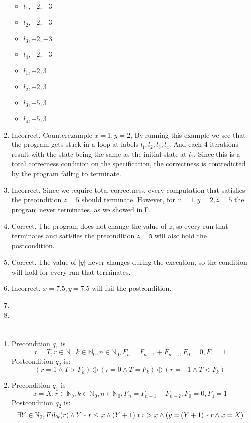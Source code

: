 \documentclass{article}
\begin{document}
\begin{enumerate}[label=\Alph*.]
\begin{itemize}
        \item $l_1, -2, -3$
        \item $l_2, -2, -3$
        \item $l_3, -2, -3$
        \item $l_4, -2, -3$
        \item $l_1, -2, 3$
        \item $l_2, -2, 3$
        \item $l_3, -5, 3$
        \item $l_4, -5, 3$
    \end{itemize}
    \item Incorrect. Counterexample $x=1,y=2$,
    By running this example we see that the program gets stuck in a loop
    at labels $l_1, l_2, l_3, l_4$. And each 4 iterations result with the state
    being the same as the initial state at $l_1$.
    Since this is a total correcness condition on the specification,
    the correctness is contredicted by the program failing to terminate.
    \item Incorrect. Since we require total correctness, every computation that satisfies the precondition $z=5$ should terminate. However, for $x=1, y=2, z=5$ the program never terminates, as we showed in F.
    \item Correct. The program does not change the value of $z$, so every run that terminates and satisfies the precondition $z=5$ will also hold the postcondition.
    \item Correct. The value of $|y|$ never changes during the execution, so the condition will hold for every run that terminates.
    \item Incorrect. $x=7.5, y=7.5$ will fail the postcondition.
    \item
    \item
\end{enumerate}

\section{}
\begin{enumerate}[label=\Alph*.]
    \item Precondition $q_1$ is $$r=T, r \in \mathbb{N}_0, k \in \mathbb{N}_0, n \in \mathbb{N}_0, F_n = F_{n-1}+F_{n-2}, F_0 = 0, F_1 = 1$$
    Postcondition $q_2$ is: $$(r=1 \wedge T>F_k) \oplus (r=0 \wedge T=F_k) \oplus (r=-1 \wedge T<F_k)$$
    
    \item Precondition $q_1$ is $$x=X, r \in \mathbb{N}_0, k \in \mathbb{N}_0, n \in \mathbb{N}_0, F_n = F_{n-1}+F_{n-2}, F_0 = 0, F_1 = 1$$
    Postcondition $q_2$ is:
    $$ \exists Y \in \mathbb{N}_0, Fib_k(r) \wedge \\
    Y*r\leq x \wedge (Y+1)*r > x \wedge \\
    (y=(Y+1)*r \wedge x=X)$$
\end{enumerate}
\end{document}
